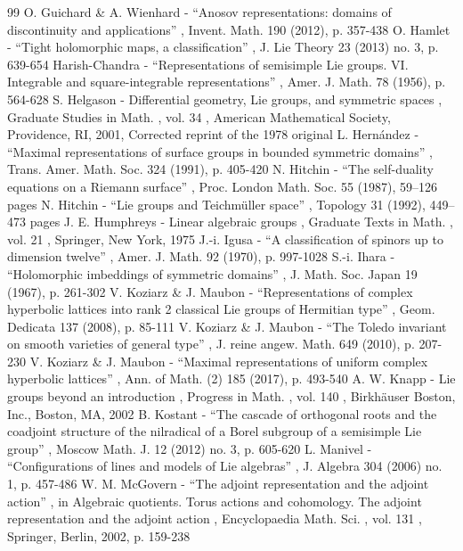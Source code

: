 \documentclass[10pt]{amsart}
\theoremstyle{plain}
\theoremstyle{definition}
\begin{document}
\begin{thebibliography}{99}
 O. Guichard \& A. Wienhard - “Anosov representations: domains of discontinuity and applications” , Invent. Math. 190 (2012), p. 357-438
 O. Hamlet - “Tight holomorphic maps, a classification” , J. Lie Theory 23 (2013) no. 3, p. 639-654
 Harish-Chandra - “Representations of semisimple Lie groups. VI. Integrable and square-integrable representations” , Amer. J. Math. 78 (1956), p. 564-628
 S. Helgason - Differential geometry, Lie groups, and symmetric spaces , Graduate Studies in Math. , vol. 34 , American Mathematical Society, Providence, RI, 2001, Corrected reprint of the 1978 original
 L. Hernández - “Maximal representations of surface groups in bounded symmetric domains” , Trans. Amer. Math. Soc. 324 (1991), p. 405-420
 N. Hitchin - “The self-duality equations on a Riemann surface” , Proc. London Math. Soc. 55 (1987), 59–126 pages
 N. Hitchin - “Lie groups and Teichmüller space” , Topology 31 (1992), 449–473 pages
 J. E. Humphreys - Linear algebraic groups , Graduate Texts in Math. , vol. 21 , Springer, New York, 1975
 J.-i. Igusa - “A classification of spinors up to dimension twelve” , Amer. J. Math. 92 (1970), p. 997-1028
 S.-i. Ihara - “Holomorphic imbeddings of symmetric domains” , J. Math. Soc. Japan 19 (1967), p. 261-302
 V. Koziarz \& J. Maubon - “Representations of complex hyperbolic lattices into rank 2 classical Lie groups of Hermitian type” , Geom. Dedicata 137 (2008), p. 85-111
 V. Koziarz \& J. Maubon - “The Toledo invariant on smooth varieties of general type” , J. reine angew. Math. 649 (2010), p. 207-230
 V. Koziarz \& J. Maubon - “Maximal representations of uniform complex hyperbolic lattices” , Ann. of Math. (2) 185 (2017), p. 493-540
 A. W. Knapp - Lie groups beyond an introduction , Progress in Math. , vol. 140 , Birkhäuser Boston, Inc., Boston, MA, 2002
 B. Kostant - “The cascade of orthogonal roots and the coadjoint structure of the nilradical of a Borel subgroup of a semisimple Lie group” , Moscow Math. J. 12 (2012) no. 3, p. 605-620
 L. Manivel - “Configurations of lines and models of Lie algebras” , J. Algebra 304 (2006) no. 1, p. 457-486
 W. M. McGovern - “The adjoint representation and the adjoint action” , in Algebraic quotients. Torus actions and cohomology. The adjoint representation and the adjoint action , Encyclopaedia Math. Sci. , vol. 131 , Springer, Berlin, 2002, p. 159-238

\end{thebibliography}
\end{document}
